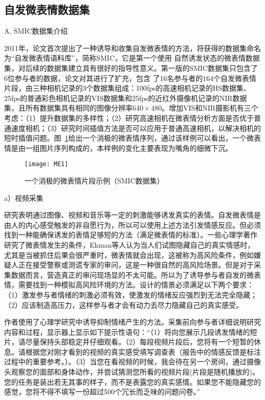 \subsection{自发微表情数据集}

A. SMIC数据集介绍

2011年，论文首次提出了一种诱导和收集自发微表情的方法，将获得的数据集命名为“自发微表情语料库”，简称SMIC，它是第一个使用
自然诱发状态的微表情数据集，对后续的数据集建立具有很好的指导性意义。第一版的SMIC数据集只包含了6位参与者的数据，论文对其进行了扩充，包含
了16名参与者的164个自发微表情片段，由三种相机记录的3个数据集组成：100fps的高速相机记录的HS数据集、25fps的普通彩色相机记录的VIS数据集和25fps的近红外摄像机记录的NIR数据集，且所有数据集具有相同的图像分辨率$640\times480$。增加VIS和NIR摄影机有三个考虑：（1）提升数据集的多样性；（2）研究高速相机在微表情分析方面是否优于普通速度相机；（3）研究时间插值方法是否可以应用于普通高速相机，以解决相机的短时插值问题。图~\ref{fig2}给出一个消极的微表情序列，通过该样例可以看出，一个微表情是由一组图片序列构成的，本样例的变化主要表现为嘴角的细微下沉。

\begin{figure}[!htbp]
    \centering
    \texttt{[image: ME1]}
    \caption{一个消极的微表情片段示例（SMIC数据集）}
    \label{fig2}
\end{figure}

a）视频采集

研究表明通过图像、视频和音乐等一定的刺激能够诱发真实的表情\citep{Coan2015Handbook}。自发微表情是由人的内心感受触发的非自愿行为，所以可以使用上述方法引发情感反应。但必须找到一种能确保诱发的表情足够短的方法（满足微表情的标准）。一些心理学著作研究了微表情发生的条件，Ekman等人认为当人们试图隐藏自己的真实情感时，尤其是当被抓住后果会很严重时，微表情就会出现，这被称为高风险条件，例如嫌疑人正在接受警察或测谎专家的审问，这是一种很自然的高风险场景。但是对于采集数据而言，营造真正的审问现场显的不太可能。所以为了诱导参与者自发的微表情，需要找到一种模拟高风险环境的方法。设计的情景必须满足以下两个要求：（1）激发参与者情绪的刺激必须有效，使激发的情绪反应强烈到无法完全隐藏；（2）应该制造高压力，这样参与者才会有动力去尽力隐藏自己的真实感受。

作者使用了心理学研究中诱导抑制情绪产生的方法。采集前向参与者详细说明研究内容和过程，显示器上显示如下提示性语句：“（1）将向您展示几段诱发情绪的短片，请尽量保持头部稳定并仔细观看。（2）每段视频片段后，您将有一个短暂的休息。请根据您对刚才看到的视频的真实感受填写调查表（报告中的情感反馈是标注过程中的重要参考。）。（3）当您在看视频的时候，我会待在另一个房间，通过摄像头观察您的面部和身体动作，并尝试猜测您所看的视频片段(片段是随机播放的)。您的任务是装出若无其事的样子，而不是表露您的真实感情。如果您不能隐藏您的感觉，您将不得不填写一份超过500个冗长而乏味的问题问卷。”

